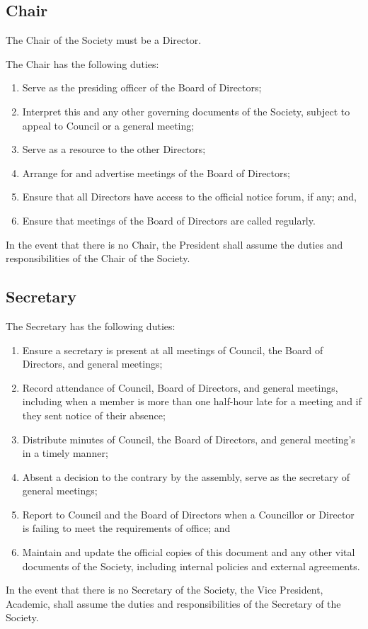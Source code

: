 \subsection{Chair}
The Chair of the Society must be a Director.

The Chair has the following duties:
\begin{enumerate}
    \item Serve as the presiding officer of the Board of Directors;
    \item Interpret this and any other governing documents of the Society,
        subject to appeal to Council or a general meeting;
    \item Serve as a resource to the other Directors;
    \item Arrange for and advertise meetings of the Board of Directors;
    \item Ensure that all Directors have access to the official notice
        forum, if any; and,
    \item Ensure that meetings of the Board of Directors are called regularly.
\end{enumerate}

In the event that there is no Chair, the President shall assume the duties and
responsibilities of the Chair of the Society. 

\subsection{Secretary}
The Secretary has the following duties:
\begin{enumerate}
    \item Ensure a secretary is present at all meetings of Council,
        the Board of Directors, and general meetings;
    \item Record attendance of Council, Board of Directors, and
        general meetings, including when a member is more than one half-hour
        late for a meeting and if they sent notice of their absence;
    \item Distribute minutes of Council, the Board of Directors, and 
        general meeting's in a timely manner;
    \item Absent a decision to the contrary by the assembly, serve as the
        secretary of general meetings;
    \item Report to Council and the Board of Directors when a Councillor
        or Director is failing to meet the requirements of office; and
    \item Maintain and update the official copies of this document and any other
        vital documents of the Society, including internal policies and external
        agreements.
\end{enumerate}

In the event that there is no Secretary of the Society, the Vice President,
Academic, shall assume the duties and responsibilities of the Secretary of the
Society.

